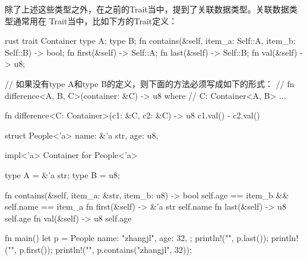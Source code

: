 除了上述这些类型之外，在之前的Trait当中，提到了关联数据类型。关联数据类型通常用在
Trait当中，比如下方的Trait定义：
\begin{code-block}{rust}
trait Container {
    type A;
    type B;
    fn contains(&self, item_a: Self::A, item_b: Self::B) -> bool;
    fn first(&self) -> Self::A;
    fn last(&self) -> Self::B;
    fn val(&self) -> u8;
}

// 如果没有type A和type B的定义，则下面的方法必须写成如下的形式：
// fn difference<A, B, C>(container: &C) -> u8 where
//    C: Container<A, B> { ... }

fn difference<C: Container>(c1: &C, c2: &C) -> u8 {
    c1.val() - c2.val()
}

struct People<'a> {
    name: &'a str,
    age: u8,
}

impl<'a> Container for People<'a> {
    type A = &'a str;
    type B = u8;

    fn contains(&self, item_a: &str, item_b: u8) -> bool {
        self.age == item_b && self.name == item_a
    }
    fn first(&self) -> &'a str {
        self.name
    }
    fn last(&self) -> u8 {
        self.age
    }
    fn val(&self) -> u8 {
        self.age
    }
}

fn main() {
    let p = People {
        name: "zhangjl",
        age: 32,
    };
    println!("{}", p.last());
    println!("{}", p.first());
    println!("{}", p.contains("zhangjl", 32));
}
\end{code-block}

